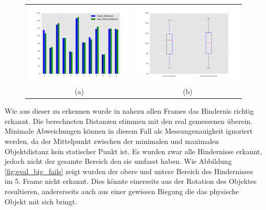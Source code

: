 	\begin{figure}[h]
		\centering
		\begin{tabular}{cc}
		\includegraphics[width=7cm]{img/evaluation/sub_big_bar}&
		\includegraphics[width=7cm]{img/evaluation/sub_big_box}\\
		 (a) & (b)
		\end{tabular}
		\caption{}
	    \label{fig:eval_big}
	\end{figure}
	
	\noindent
	Wie aus dieser zu erkennen wurde in nahezu allen Frames das Hindernis richtig erkannt. Die berechneten Distanzen stimmen mit den real gemessenen überein. Minimale Abweichungen können in diesem Fall als Messungenauigkeit ignoriert werden, da der Mittelpunkt zwischen der minimalen und maximalen Objektdistanz kein statischer Punkt ist. Es wurden zwar alle Hindernisse erkannt, jedoch nicht der gesamte Bereich den sie umfasst haben. Wie Abbildung \ref{fig:eval_big_fails} zeigt wurden der obere und untere Bereich des Hindernisses im 5. Frame nicht erkannt. Dies könnte einerseits aus der Rotation des Objektes resultieren, andererseits auch aus einer gewissen Biegung die das physische Objekt mit sich bringt.
	
